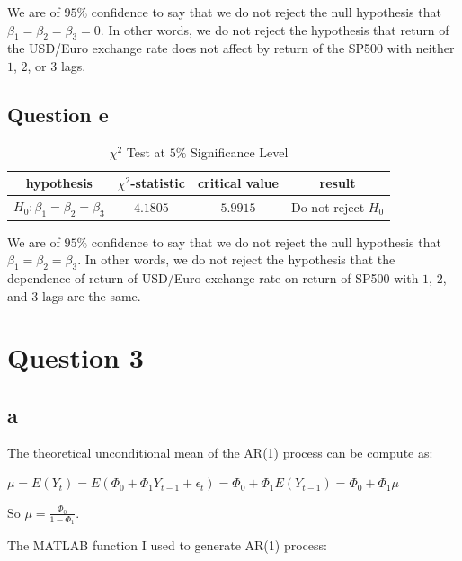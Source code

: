 \documentclass{report}
\begin{document}
We are of $95\%$ confidence to say that we do not reject the null hypothesis that $\beta_1=\beta_2=\beta_3=0$. In other words, we do not reject the hypothesis that return of the USD/Euro exchange rate does not affect by return of the SP500 with neither $1$, $2$, or $3$ lags.

\subsection*{Question e}

\begin{table}[H]
	\begin{center}
		\caption{$\chi^2$ Test at $5\%$ Significance Level}
		\label{tab:table7}
		\vspace{2mm}
		\begin{tabular}{c|c|c|c|} 
			
			
			\textbf{hypothesis} & \textbf{$\chi^2$-statistic}&  \textbf{critical value}& \textbf{result}\\
			\hline
			$H_0:\beta_1=\beta_2=\beta_3$ &$4.1805$ &$5.9915$ &Do not reject $H_0$  \\
		\end{tabular}
	\end{center}
\end{table}

We are of $95\%$ confidence to say that we do not reject the null hypothesis that $\beta_1=\beta_2=\beta_3$. In other words, we do not reject the hypothesis that the dependence of return of USD/Euro exchange rate on return of SP500 with $1$, $2$, and $3$ lags are the same.


\section*{Question 3}
\subsection*{a}
The theoretical unconditional mean of the AR(1) process can be compute as:

$\mu = E(Y_t)=E(\Phi_0+\Phi_1 Y_{t-1}+\epsilon_t)=\Phi_0+\Phi_1 E(Y_{t-1})=\Phi_0+\Phi_1 \mu$

So $\mu=\frac{\Phi_0}{1-\Phi_1}$.

The MATLAB function I used to generate AR(1) process:


\end{document}
